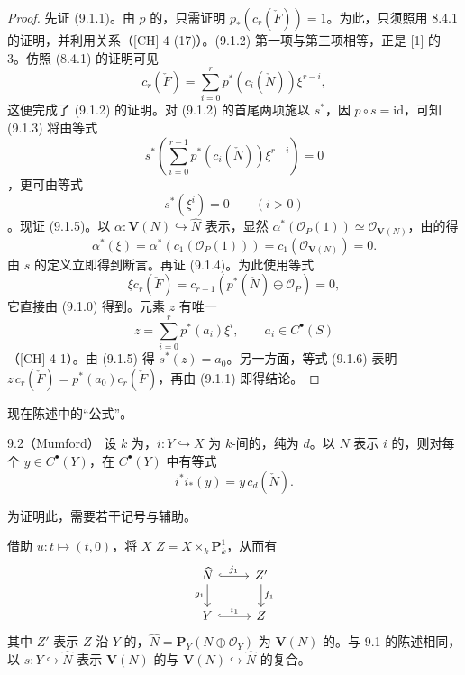 \begin{proof}
先证 (9.1.1)。由 $p$ 的，只需证明 $p_*(c_r(\check F))=1$。为此，只须照用 8.4.1 的证明，并利用关系（[CH] 4 (17)）。(9.1.2) 第一项与第三项相等，正是 [1] 的 3。仿照 (8.4.1) 的证明可见
\[
 c_r(\check F)=\sum_{i=0}^r p^*(c_i(\check N))\xi^{r-i},\tag{9.1.2 bis}
\]
这便完成了 (9.1.2) 的证明。对 (9.1.2) 的首尾两项施以 $s^*$，因 $p\circ s=\mathrm{id}$，可知 (9.1.3) 将由等式
\[
 s^*\left(\sum_{i=0}^{r-1}p^*(c_i(\check N))\xi^{r-i}\right)=0
\]
，更可由等式
\[
 s^*(\xi^i)=0\qquad(i>0)\tag{9.1.5}
\]
。现证 (9.1.5)。以 $\alpha:\mathbf V(N)\hookrightarrow\widehat N$ 表示，显然 $\alpha^*(\mathscr O_P(1))\simeq\mathscr O_{\mathbf V(N)}$，由的得
\[
 \alpha^*(\xi)=\alpha^*(c_1(\mathscr O_P(1)))=c_1(\mathscr O_{\mathbf V(N)})=0.
\]
由 $s$ 的定义立即得到断言。再证 (9.1.4)。为此使用等式
\[
 \xi c_r(\check F)=c_{r+1}(p^*(\check N)\oplus\mathscr O_P)=0,\tag{9.1.6}
\]
它直接由 (9.1.0) 得到。元素 $z$ 有唯一
\[
 z=\sum_{i=0}^r p^*(a_i)\xi^i,\qquad a_i\in C^\bullet(S)
\]
（[CH] 4  1）。由 (9.1.5) 得 $s^*(z)=a_0$。另一方面，等式 (9.1.6) 表明 $z\,c_r(\check F)=p^*(a_0)c_r(\check F)$，再由 (9.1.1) 即得结论。
\end{proof}
现在陈述中的“公式”。
\begin{SGAresult}{}{9.2（Mumford）}
设 $k$ 为，$i:Y\hookrightarrow X$ 为 $k$-间的，纯为 $d$。以 $N$ 表示 $i$ 的，则对每个 $y\in C^\bullet(Y)$，在 $C^\bullet(Y)$ 中有等式
\[
 i^*i_*(y)=y\,c_d(\check N).
\]
\end{SGAresult}
为证明此，需要若干记号与辅助。

借助 $u:t\mapsto(t,0)$，将 $X$  $Z=X\times_k\mathbf P_k^1$，从而有
\[
\begin{tikzcd}
\widehat N\arrow[r,hook,"j_1"]\arrow[d,"g_1"']&Z'\arrow[d,"f_1"]\\
Y\arrow[r,hook,"i_1"]&Z
\end{tikzcd}
\]
其中 $Z'$ 表示 $Z$ 沿 $Y$ 的，$\widehat N=\mathbf P_Y(N\oplus\mathscr O_Y)$ 为 $\mathbf V(N)$ 的。与 9.1 的陈述相同，以 $s:Y\hookrightarrow\widehat N$ 表示 $\mathbf V(N)$ 的与 $\mathbf V(N)\hookrightarrow\widehat N$ 的复合。

